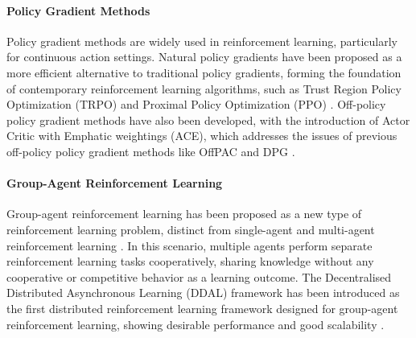 \paragraph{Policy Gradient Methods}
Policy gradient methods are widely used in reinforcement learning, particularly for continuous action settings. Natural policy gradients have been proposed as a more efficient alternative to traditional policy gradients, forming the foundation of contemporary reinforcement learning algorithms, such as Trust Region Policy Optimization (TRPO) and Proximal Policy Optimization (PPO) \cite{2209.01820}. Off-policy policy gradient methods have also been developed, with the introduction of Actor Critic with Emphatic weightings (ACE), which addresses the issues of previous off-policy policy gradient methods like OffPAC and DPG \cite{1811.09013}.

\paragraph{Group-Agent Reinforcement Learning}
Group-agent reinforcement learning has been proposed as a new type of reinforcement learning problem, distinct from single-agent and multi-agent reinforcement learning \cite{2202.05135}. In this scenario, multiple agents perform separate reinforcement learning tasks cooperatively, sharing knowledge without any cooperative or competitive behavior as a learning outcome. The Decentralised Distributed Asynchronous Learning (DDAL) framework has been introduced as the first distributed reinforcement learning framework designed for group-agent reinforcement learning, showing desirable performance and good scalability \cite{2202.05135}.